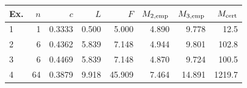 \begin{tabular}{lrrrrrrr}
\toprule
Ex. & $n$ & $c$ & $L$ & $F$ & $M_{2,\rm emp}$ & $M_{3,\rm emp}$ & $M_{\rm cert}$\\
\midrule
1 & 1 & 0.3333 & 0.500 & 5.000 & 4.890 & 9.778 & 12.5\\
2 & 6 & 0.4362 & 5.839 & 7.148 & 4.944 & 9.801 & 102.8\\
3 & 6 & 0.4469 & 5.839 & 7.148 & 4.870 & 9.724 & 100.5\\
4 & 64 & 0.3879 & 9.918 & 45.909 & 7.464 & 14.891 & 1219.7\\
\bottomrule
\end{tabular}